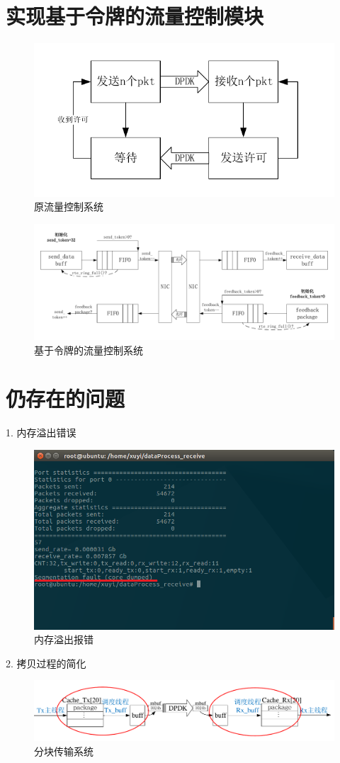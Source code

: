 \documentclass{article}
\begin{document}
\section{实现基于令牌的流量控制模块}
\begin{figure}[H]
	\centering
	\includegraphics[width = .6\textwidth]{flow_traffic.pdf}
	\caption{原流量控制系统}
\end{figure}
\begin{figure}[H]
	\centering
	\includegraphics[width = \textwidth]{frame_token.pdf}
	\caption{基于令牌的流量控制系统}
\end{figure}

\newpage
\section{仍存在的问题}
1. 内存溢出错误
\begin{figure}[H]
	\centering
	\includegraphics[width = .8\textwidth]{receive_res_dumped.png}
	\caption{内存溢出报错}
\end{figure}
2. 拷贝过程的简化
\begin{figure}[H]
	\centering
	\includegraphics[width = \textwidth]{frame_sys_copy.pdf}
	\caption{分块传输系统}
\end{figure}
\end{document}
